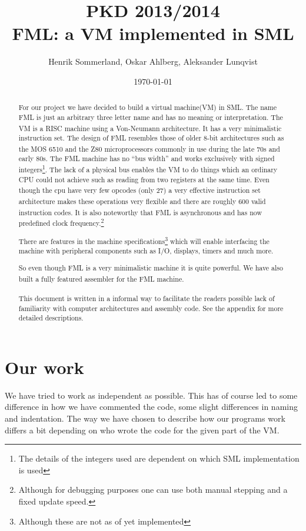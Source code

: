 \documentclass{article}
\title{PKD 2013/2014 \\ FML: a VM implemented in SML}
\author{Henrik Sommerland, Oskar Ahlberg, Aleksander Lunqvist}
\date{\today}
\begin{document}
\maketitle

\begin{abstract}
For our project we have decided to build a virtual
machine(VM)\textsuperscript{\cite{Virtual}} in SML.
The name FML is just an arbitrary three letter name and has no meaning or interpretation.
The VM is a RISC\textsuperscript{\cite{risc}} machine using a Von-Neumann
architecture\textsuperscript{\cite{neuman}}. It has a very minimalistic
instruction set. The design of FML resembles those of older 8-bit architectures such as the MOS 6510\textsuperscript{\cite{6510}} and the
Z80\textsuperscript{\cite{z80}} microprocessors commonly in use during the late
70s and early 80s. The FML machine has no ``bus width'' and works exclusively with signed integers\footnote{The details of the integers
used are dependent on which SML implementation is used}. The lack of a physical
bus enables the VM to do things which an ordinary CPU could not achieve such as
reading from two registers at the same time. Even though
the cpu have very few opcodes\textsuperscript{\cite{opcode}} (only 27) a very
effective instruction set architecture\textsuperscript{\cite{ISA}} makes these operations very flexible
and there are roughly 600 valid instruction codes. It is also noteworthy that
FML is asynchronous\textsuperscript{\cite{async}} and has now predefined clock
frequency.\footnote{Although for debugging purposes one can use both manual stepping and a fixed update speed.}

There are features in the machine specifications\footnote{Although these are
not as of yet implemented} which will enable interfacing the machine with
peripheral components such as I/O, displays, timers and much more.

So even though FML is a very minimalistic machine it is quite powerful.
We have also built a fully featured assembler\textsuperscript{\cite{assembler}}
for the FML machine.
\\
\\
This document is written in a informal way to facilitate the readers possible
lack of familiarity with computer architectures and assembly code. See the
appendix for more detailed descriptions.
\end{abstract}
\newpage
\tableofcontents
\newpage
\section{Our work}
We have tried to work as independent as possible. This has of course led to some
difference in how we have commented the code, some slight differences in naming
and indentation. The way we have chosen to describe how our programs work
differs a bit depending on who wrote the code for the given part of the
VM.
\end{document}
